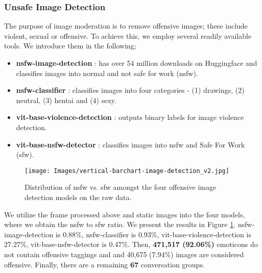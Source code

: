 \subsubsection{Unsafe Image Detection}
The purpose of image moderation is to remove offensive images; these include violent, sexual or offensive. To achieve this, we employ several readily available tools. We introduce them in the following;
\begin{itemize}
    \item \textbf{nsfw-image-detection} \cite{falconsai2024nsfw}: has over 54 million downloads on Huggingface and classifies images into normal and not safe for work (nsfw).
    \item \textbf{nsfw-classifier} \cite{giacomo_arienti_2024}: classifies images into four categories - (1) drawings, (2) neutral, (3) hentai and (4) sexy.
    \item \textbf{vit-base-violence-detection} \cite{jaranohaal2024violence}: outputs binary labels for image violence detection.
    \item \textbf{vit-base-nsfw-detector} \cite{adamcodd2024nsfw}: classifies images into nsfw and Safe For Work (sfw).
\end{itemize}


\begin{figure}[htbp]
    \centering
    \texttt{[image: Images/vertical-barchart-image-detection\_v2.jpg]}
    \caption{Distribution of nsfw vs. sfw amongst the four offensive image detection models on the raw data.}
    \label{fig:image-detection-v2}
\end{figure}


We utilize the frame processed above and static images into the four models, where we obtain the nsfw to sfw ratio. We present the results in Figure \ref{fig:image-detection-v2}. nsfw-image-detection is 0.88\%, nsfw-classifier is 0.93\%, vit-base-violence-detection is 27.27\%, vit-base-nsfw-detector  is 0.47\%. Then, \textbf{471,517 (92.06\%)} emoticons do not contain offensive taggings and and {40,675 (7.94\%)} images are considered offensive. Finally, there are a remaining \textbf{67} conversation groups.

